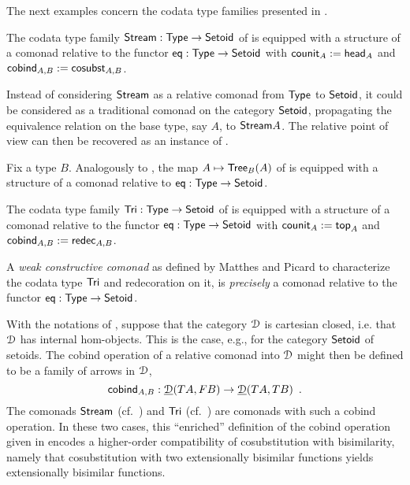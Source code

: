 \documentclass[a4paper,USenglish]{lipics}
\begin{document}
\noindent
The next examples concern the codata type families presented in .

\begin{ex}[Streams]\label{ex_stream_comonad}
  The codata type family $\mathsf{Stream} : \mathsf{Type} \to \mathsf{Setoid}$ of  is equipped with a structure of a comonad relative to the functor 
  $\mathsf{eq} : \mathsf{Type} \to \mathsf{Setoid}$ with
   $\mathsf{counit}_A := \mathsf{head}_A$ and
   $\mathsf{cobind}_{A,B} := \mathsf{cosubst}_{A,B}$.
\end{ex}


\begin{rem}
 Instead of considering $\mathsf{Stream}$ as a relative comonad from $\mathsf{Type}$ to $\mathsf{Setoid}$, it could be considered as a traditional comonad on the 
 category $\mathsf{Setoid}$, propagating the equivalence relation on the base type, say $A$, to $\mathsf{Stream} A$.
 The relative point of view can then be recovered as an instance of .
\end{rem}



\begin{ex}[Trees]\label{ex_tree_comonad}
 Fix a type $B$. Analogously to , the map $A \mapsto \mathsf{Tree}_B(A)$ of 
 is equipped with a structure of a comonad relative to $\mathsf{eq}: \mathsf{Type}\to\mathsf{Setoid}$.
\end{ex}

\begin{ex}\label{ex:tri_comonad}
  The codata type family $\mathsf{Tri} : \mathsf{Type} \to \mathsf{Setoid}$ of  is equipped with a structure of a comonad relative to the functor 
  $\mathsf{eq} : \mathsf{Type} \to \mathsf{Setoid}$ with
   $\mathsf{counit}_A := \mathsf{top}_A$ and
   $\mathsf{cobind}_{A,B} := \mathsf{redec}_{A,B}$.
\end{ex}


\begin{rem}
  A \emph{weak constructive comonad} as defined by Matthes and Picard \cite{DBLP:conf/types/MatthesP11} to characterize the codata type $\mathsf{Tri}$
  and redecoration on it, is \emph{precisely}
  a comonad relative to the functor $\mathsf{eq} : \mathsf{Type}\to\mathsf{Setoid}$.
\end{rem}


\begin{rem}
 With the notations of , suppose that the category $\mathcal{D}$ is cartesian closed, i.e. that $\mathcal{D}$ has
 internal hom-objects. This is the case, e.g., for the category $\mathsf{Setoid}$ of setoids.
 The cobind operation of a relative comonad into $\mathcal{D}$ might then be defined to be a family of arrows in $\mathcal{D}$,
  \begin{equation}\mathsf{cobind}_{A,B} : \underline{\mathcal{D}}(TA,FB) \to \underline{\mathcal{D}}(TA,TB) \enspace . \label{eq_enriched}\end{equation}
 The comonads $\mathsf{Stream}$ (cf.\ ) and $\mathsf{Tri}$ (cf.\ ) are comonads with such a cobind operation. In these two cases, this \enquote{enriched} definition of the cobind operation given in  encodes a higher-order 
 compatibility of cosubstitution with bisimilarity, namely that cosubstitution with two extensionally bisimilar functions
 yields extensionally bisimilar functions.
\end{rem}
\end{document}
